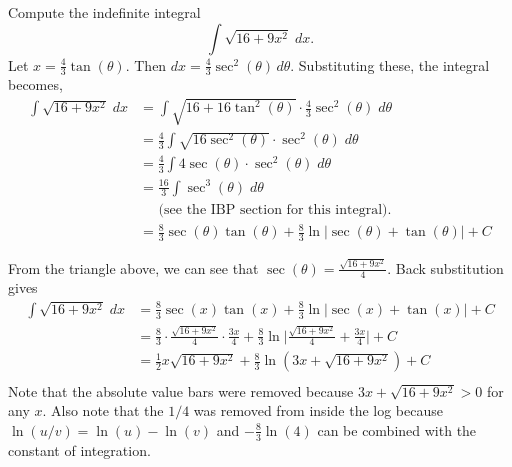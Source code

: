 \documentclass[handout]{ximera}
\begin{document}
\begin{example}[example 11]
Compute the indefinite integral
\[
\int \sqrt{16 + 9x^2} \; dx.
\]
Let $x = \frac43 \tan(\theta)$. Then $dx = \frac43 \sec^2(\theta) \, d\theta$.
Substituting these, the integral becomes,
\begin{align*}
\int \sqrt{16 + 9x^2} \; dx &= \int \sqrt{16+16\tan^2(\theta)} \cdot \frac43\sec^2(\theta) \;  d\theta\\[6pt]
                            &= \frac43\int \sqrt{16\sec^2(\theta)} \cdot \sec^2(\theta) \; d\theta\\[6pt]
                            &= \frac43\int 4\sec(\theta) \cdot \sec^2(\theta) \; d\theta\\[6pt]
                            &= \frac{16}{3}\int \sec^3(\theta) \; d\theta\\[6pt]
                            &\;\;\;\;\;\text{(see the IBP section for this integral).}\\[6pt]
                            &= \frac{8}{3}\sec(\theta) \tan(\theta) + \frac{8}{3} \ln|\sec(\theta) + \tan(\theta)| + C
\end{align*}
                            


\begin{image}
\end{image}





From the triangle above, we can see that $\sec(\theta) = \frac{\sqrt{16+9x^2}}{4 }$. Back substitution gives
\begin{align*}
\int \sqrt{16 + 9x^2} \; dx &= \frac{8}{3} \sec(x) \tan(x) + \frac{8}{3} \ln|\sec(x) + \tan(x)| + C\\
                            &=  \frac{8}{3} \cdot\frac{\sqrt{16+9x^2}}{4 } \cdot \frac{3x}{4}  + \frac{8}{3} \ln\bigg|\frac{\sqrt{16+9x^2}}{4 } + \frac{3x}{4}\bigg| + C\\
                            &=   \frac12 x\sqrt{16+9x^2}  + \frac83 \ln\left(3x +  \sqrt{16+9x^2}\right) + C\\
\end{align*}
Note that the absolute value bars were removed because $3x +  \sqrt{16+9x^2} > 0$ for any $x$. Also note that the $1/4$ was removed from inside the log 
because $\ln(u/v) = \ln(u) - \ln(v)$ and $-\frac83\ln(4)$ can be combined with the constant of integration.
\end{example}
\end{document}
